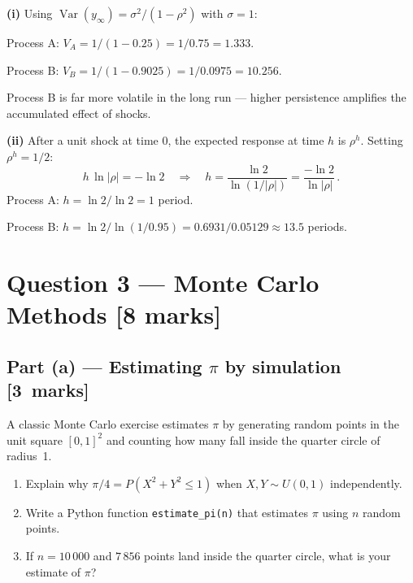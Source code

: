 \documentclass[11pt,a4paper]{article}
\newcommand{\mkpts}[1]{\hfill\textbf{[#1~marks]}}
\begin{document}
\begin{solution}
\textbf{(i)} Using $\operatorname{Var}(y_\infty) = \sigma^2/(1-\rho^2)$ with $\sigma=1$:

Process A: $V_A = 1/(1-0.25) = 1/0.75 = 1.333$.

Process B: $V_B = 1/(1-0.9025) = 1/0.0975 = 10.256$.

Process B is far more volatile in the long run --- higher persistence amplifies the accumulated effect of shocks.

\medskip

\textbf{(ii)} After a unit shock at time $0$, the expected response at time $h$ is $\rho^h$.  Setting $\rho^h = 1/2$:
\[
h\,\ln|\rho| = -\ln 2 \quad\Longrightarrow\quad h = \frac{\ln 2}{\ln(1/|\rho|)} = \frac{-\ln 2}{\ln|\rho|}\,.
\]
Process A: $h = \ln 2/\ln 2 = 1$ period.

Process B: $h = \ln 2/\ln(1/0.95) = 0.6931/0.05129 \approx 13.5$ periods.
\end{solution}


\newpage

\section*{Question 3 --- Monte Carlo Methods \hfill [8 marks]}

\subsection*{Part (a) --- Estimating $\pi$ by simulation \mkpts{3}}

A classic Monte Carlo exercise estimates $\pi$ by generating random points in the unit square $[0,1]^2$ and counting how many fall inside the quarter circle of radius~1.

\begin{enumerate}[label=(\roman*),nosep]
\item Explain why $\pi/4 = P(X^2+Y^2 \le 1)$ when $X, Y \sim U(0,1)$ independently.
\item Write a Python function \texttt{estimate\_pi(n)} that estimates $\pi$ using $n$ random points.
\item If $n=10\,000$ and $7\,856$ points land inside the quarter circle, what is your estimate of $\pi$?
\end{enumerate}
\end{document}
